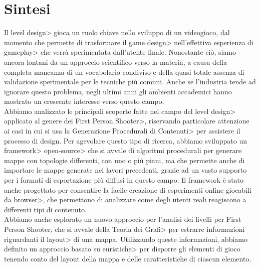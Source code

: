 \chapter{Sintesi}

Il \<level design> gioca un ruolo chiave nello sviluppo di un videogioco, dal momento che permette di trasformare il \<game design> nell'effettiva esperienza di \<gameplay> che verrà sperimentata dall'utente finale. Nonostante ciò, siamo ancora lontani da un approccio scientifico verso la materia, a causa della completa mancanza di un vocabolario condiviso e della quasi totale assenza di validazione sperimentale per le tecniche più comuni. Anche se l'industria tende ad ignorare questo problema, negli ultimi anni gli ambienti accademici hanno mostrato un crescente interesse verso questo campo. \\
Abbiamo analizzato le principali scoperte fatte nel campo del \<level design> applicato al genere dei \<First Person Shooter>, riservando particolare attenzione ai casi in cui si usa la \<Generazione Procedurali di Contenuti> per assistere il processo di design. Per agevolare questo tipo di ricerca, abbiamo sviluppato un \<framework> \<open-source> che si avvale di algoritmi procedurali per generare mappe con topologie differenti, con uno o più piani, ma che permette anche di importare le mappe generate nei lavori precedenti, grazie ad un vasto supporto per i formati di esportazione più diffusi in questo campo. Il framework è stato anche progettato per consentire la facile creazione di \<esperimenti online giocabili da browser>, che permettono di analizzare come degli utenti reali reagiscono a differenti tipi di contenuto. \\
Abbiamo anche esplorato un nuovo approccio per l'analisi dei livelli per First Person Shooter, che si avvale della \<Teoria dei Grafi> per estrarre informazioni riguardanti il \<layout> di una mappa. Utilizzando queste informazioni, abbiamo definito un approccio basato su \<euristiche> per disporre gli elementi di gioco tenendo conto del layout della mappa e delle caratteristiche di ciascun elemento.
